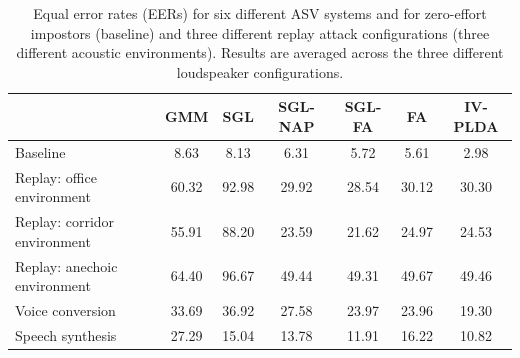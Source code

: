 

\begin{table}
\renewcommand{\arraystretch}{1.2}
\begin{center}
    \begin{tabular}{ l  c c c c c c}
    \hline
 &  GMM & SGL & SGL-NAP  & SGL-FA & FA & IV-PLDA \\ 
 \hline \hline
Baseline & 8.63 & 8.13 & 6.31 & 5.72 & 5.61 & 2.98\\
\hline
Replay: office environment & 60.32 & 92.98 & 29.92 & 28.54 & 30.12 & 30.30\\
Replay: corridor environment & 55.91 & 88.20 & 23.59 & 21.62 & 24.97 & 24.53\\
Replay: anechoic environment & 64.40 & 96.67 & 49.44 & 49.31 & 49.67 & 49.46\\
\hline
Voice conversion & 33.69 & 36.92 & 27.58 & 23.97 & 23.96 & 19.30\\
Speech synthesis & 27.29 & 15.04 & 13.78 & 11.91 & 16.22 & 10.82\\
\hline
    \end{tabular}
    \caption{Equal error rates (EERs) for six different ASV systems and for zero-effort impostors (baseline) and three different replay attack configurations (three different acoustic environments).  Results are averaged across the three different loudspeaker configurations.}
		\label{tab::results_EER}
   \end{center}
\end{table}








